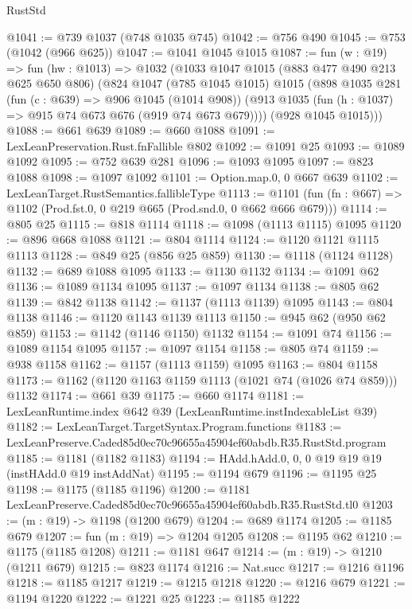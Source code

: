 \begin{lexlean}{RustStd}
\begin{coremodule}
@1041 := @739 @1037 (@748 @1035 @745)
@1042 := @756 @490
@1045 := @753 (@1042 (@966 @625))
@1047 := @1041 @1045 @1015
@1087 := fun (w : @19) =>
  fun (hw : @1013) =>
  @1032
    (@1033
      @1047
      @1015
      (@883 @477 @490 @213 @625 @650 @806)
      (@824
        @1047
        (@785 @1045 @1015)
        @1015
        (@898
          @1035
          @281
          (fun (c : @639) => @906 @1045 (@1014 @908))
          (@913 @1035 (fun (h : @1037) => @915 @74 @673 @676 (@919 @74 @673 @679))))
        (@928 @1045 @1015)))
@1088 := @661 @639
@1089 := @660 @1088
@1091 := LexLeanPreservation.Rust.fnFallible @802
@1092 := @1091 @25
@1093 := @1089 @1092
@1095 := @752 @639 @281
@1096 := @1093 @1095
@1097 := @823 @1088
@1098 := @1097 @1092
@1101 := Option.map.{0, 0} @667 @639
@1102 := LexLeanTarget.RustSemantics.fallibleType
@1113 := @1101
    (fun (fn : @667) => @1102 (Prod.fst.{0, 0} @219 @665 (Prod.snd.{0, 0} @662 @666 @679)))
@1114 := @805 @25
@1115 := @818 @1114
@1118 := @1098 (@1113 @1115) @1095
@1120 := @896 @668 @1088
@1121 := @804 @1114
@1124 := @1120 @1121 @1115 @1113
@1128 := @849 @25 (@856 @25 @859)
@1130 := @1118 (@1124 @1128)
@1132 := @689 @1088 @1095
@1133 := @1130 @1132
@1134 := @1091 @62
@1136 := @1089 @1134 @1095
@1137 := @1097 @1134
@1138 := @805 @62
@1139 := @842 @1138
@1142 := @1137 (@1113 @1139) @1095
@1143 := @804 @1138
@1146 := @1120 @1143 @1139 @1113
@1150 := @945 @62 (@950 @62 @859)
@1153 := @1142 (@1146 @1150) @1132
@1154 := @1091 @74
@1156 := @1089 @1154 @1095
@1157 := @1097 @1154
@1158 := @805 @74
@1159 := @938 @1158
@1162 := @1157 (@1113 @1159) @1095
@1163 := @804 @1158
@1173 := @1162 (@1120 @1163 @1159 @1113 (@1021 @74 (@1026 @74 @859))) @1132
@1174 := @661 @39
@1175 := @660 @1174
@1181 := LexLeanRuntime.index @642 @39 (LexLeanRuntime.instIndexableList @39)
@1182 := LexLeanTarget.TargetSyntax.Program.functions
@1183 := LexLeanPreserve.Caded85d0ec70c96655a45904ef60abdb.R35.RustStd.program
@1185 := @1181 (@1182 @1183)
@1194 := HAdd.hAdd.{0, 0, 0} @19 @19 @19 (instHAdd.{0} @19 instAddNat)
@1195 := @1194 @679
@1196 := @1195 @25
@1198 := @1175 (@1185 @1196)
@1200 := @1181 LexLeanPreserve.Caded85d0ec70c96655a45904ef60abdb.R35.RustStd.tl0
@1203 := (m : @19) -> @1198 (@1200 @679)
@1204 := @689 @1174
@1205 := @1185 @679
@1207 := fun (m : @19) => @1204 @1205
@1208 := @1195 @62
@1210 := @1175 (@1185 @1208)
@1211 := @1181 @647
@1214 := (m : @19) -> @1210 (@1211 @679)
@1215 := @823 @1174
@1216 := Nat.succ
@1217 := @1216 @1196
@1218 := @1185 @1217
@1219 := @1215 @1218
@1220 := @1216 @679
@1221 := @1194 @1220
@1222 := @1221 @25
@1223 := @1185 @1222

\end{coremodule}
\end{lexlean}
